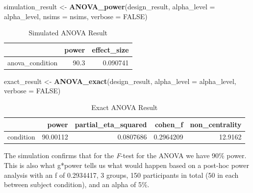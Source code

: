 \documentclass[
]{book}
\newenvironment{Shaded}{\begin{snugshade}}{\end{snugshade}}
\newcommand{\DataTypeTok}[1]{\textcolor[rgb]{0.13,0.29,0.53}{#1}}
\newcommand{\KeywordTok}[1]{\textcolor[rgb]{0.13,0.29,0.53}{\textbf{#1}}}
\newcommand{\NormalTok}[1]{#1}
\newcommand{\OtherTok}[1]{\textcolor[rgb]{0.56,0.35,0.01}{#1}}
\newcommand{\StringTok}[1]{\textcolor[rgb]{0.31,0.60,0.02}{#1}}
\begin{document}
\begin{Shaded}
\begin{Highlighting}[]
\NormalTok{simulation_result <-}\StringTok{ }\KeywordTok{ANOVA_power}\NormalTok{(design_result, }
                                 \DataTypeTok{alpha_level =}\NormalTok{ alpha_level, }
                                 \DataTypeTok{nsims =}\NormalTok{ nsims,}
                                 \DataTypeTok{verbose =} \OtherTok{FALSE}\NormalTok{)}
\end{Highlighting}
\end{Shaded}

\begin{table}[!h]

\caption{\label{tab:unnamed-chunk-43}Simulated ANOVA Result}
\centering
\begin{tabular}[t]{l|r|r}
\hline
  & power & effect\_size\\
\hline
anova\_condition & 90.3 & 0.090741\\
\hline
\end{tabular}
\end{table}

\begin{Shaded}
\begin{Highlighting}[]
\NormalTok{exact_result <-}\StringTok{ }\KeywordTok{ANOVA_exact}\NormalTok{(design_result,}
                            \DataTypeTok{alpha_level =}\NormalTok{ alpha_level,}
                            \DataTypeTok{verbose =} \OtherTok{FALSE}\NormalTok{)}
\end{Highlighting}
\end{Shaded}

\begin{table}[!h]

\caption{\label{tab:unnamed-chunk-45}Exact ANOVA Result}
\centering
\begin{tabular}[t]{l|r|r|r|r}
\hline
  & power & partial\_eta\_squared & cohen\_f & non\_centrality\\
\hline
condition & 90.00112 & 0.0807686 & 0.2964209 & 12.9162\\
\hline
\end{tabular}
\end{table}

The simulation confirms that for the \emph{F}-test for the ANOVA we have 90\% power. This is also what g*power tells us what would happen based on a post-hoc power analysis with an f of 0.2934417, 3 groups, 150 participants in total (50 in each between subject condition), and an alpha of 5\%.
\end{document}
